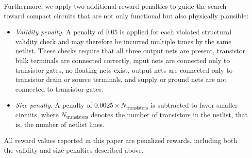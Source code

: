 \documentclass[sigconf,pbalance]{acmart_modified}
\begin{document}
Furthermore, we apply two additional reward penalties to guide the search toward compact circuits that are not only functional but also physically plausible:
\begin{itemize}[noitemsep, topsep=0pt, leftmargin=*]
\item \emph{Validity penalty.} A penalty of $0.05$ is applied for each violated structural validity check and may therefore be incurred multiple times by the same netlist. These checks require that all three output nets are present, transistor bulk terminals are connected correctly, input nets are connected only to transistor gates, no floating nets exist, output nets are connected only to transistor drain or source terminals, and supply or ground nets are not connected to transistor gates.
\item \emph{Size penalty.} A penalty of $0.0025 \times N_\text{transistors}$ is subtracted to favor smaller circuits, where $N_\text{transistors}$ denotes the number of transistors in the netlist, that is, the number of netlist lines.
\end{itemize}
All reward values reported in this paper are penalized rewards, including both the validity and size penalties described above.
\end{document}
